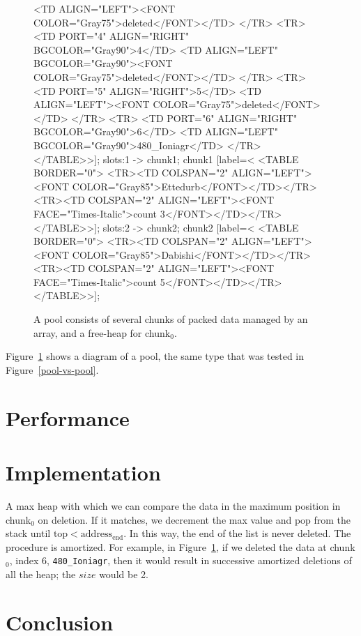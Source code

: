 \documentclass[12pt]{article}
\newcommand{\code}[1]{\colorbox{light-gray}{\texttt{#1}}}
\begin{document}
\begin{figure}
{		<TD ALIGN="LEFT"><FONT COLOR="Gray75">deleted</FONT></TD>
	</TR>
	<TR>
		<TD PORT="4" ALIGN="RIGHT" BGCOLOR="Gray90">4</TD>
		<TD ALIGN="LEFT" BGCOLOR="Gray90"><FONT COLOR="Gray75">deleted</FONT></TD>
	</TR>
	<TR>
		<TD PORT="5" ALIGN="RIGHT">5</TD>
		<TD ALIGN="LEFT"><FONT COLOR="Gray75">deleted</FONT></TD>
	</TR>
	<TR>
		<TD PORT="6" ALIGN="RIGHT" BGCOLOR="Gray90">6</TD>
		<TD ALIGN="LEFT" BGCOLOR="Gray90">480_Ioniagr</TD>
	</TR>
</TABLE>>];
	slots:1 -> chunk1;
	chunk1 [label=<
<TABLE BORDER="0">
	<TR><TD COLSPAN="2" ALIGN="LEFT"><FONT COLOR="Gray85">Ettedurb</FONT></TD></TR>
	<TR><TD COLSPAN="2" ALIGN="LEFT"><FONT FACE="Times-Italic">count 3</FONT></TD></TR>
</TABLE>>];
	slots:2 -> chunk2;
	chunk2 [label=<
<TABLE BORDER="0">
	<TR><TD COLSPAN="2" ALIGN="LEFT"><FONT COLOR="Gray85">Dabishi</FONT></TD></TR>
	<TR><TD COLSPAN="2" ALIGN="LEFT"><FONT FACE="Times-Italic">count 5</FONT></TD></TR>
</TABLE>>];
	}
	\caption{A pool consists of several chunks of packed data managed by an array, and a free-heap for chunk$_0$.}
	\label{pool}
\end{figure}

Figure~\ref{pool} shows a diagram of a pool, the same type that was tested in Figure~\ref{pool-vs-pool}.

\section{Performance}

\section{Implementation}

A max heap\cite{williams1964heapsort} with which we can compare the data in the maximum position in chunk$_0$ on deletion. If it matches, we decrement the max value and pop from the stack until $\text{top} < \text{address}_\text{end}$. In this way, the end of the list is never deleted. The procedure is amortized. For example, in Figure~\ref{pool}, if we deleted the data at chunk$_0$, index 6, \code{480\_Ioniagr}, then it would result in successive amortized deletions of all the heap; the $size$ would be 2.


\section{Conclusion}



\end{document}
